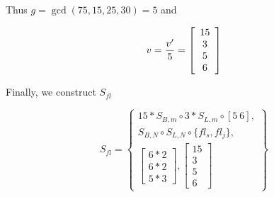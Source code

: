 Thus $g = \gcd(75,15,25,30) = 5$ and

\begin{displaymath}
v = {v' \over 5} = \left[
\begin{array}{c}
15 \\
3 \\
5 \\
6
\end{array}\right]
\end{displaymath}

Finally, we construct $S_{fl}$

\begin{displaymath}
S_{fl} = \left\{
\begin{array}{c}
15 * S_{B, m} \circ 3 * S_{L, m} \circ [5\ 6], \\
S_{B, N} \circ S_{L, N} \circ \{fl_s, fl_j\}, \\
\left[
\begin{array}{c}
6 * 2 \\ 6 * 2 \\ 5 * 3
\end{array}
\right], \left[
\begin{array}{c}
15 \\ 3 \\ 5 \\ 6
\end{array}\right]
\end{array} \right\}
\end{displaymath}
